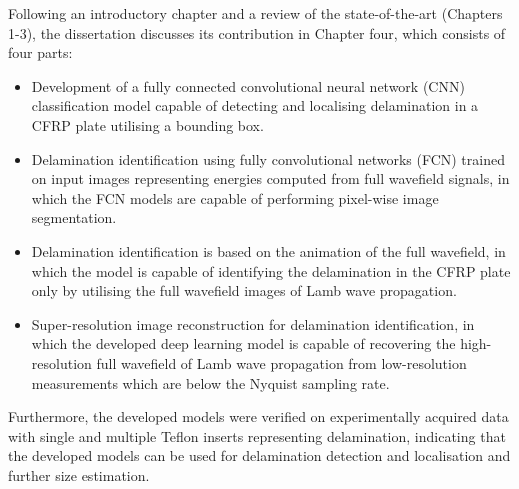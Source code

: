 \documentclass{article}
\begin{document}
	Following an introductory chapter and a review of the state-of-the-art (Chapters 1-3), the dissertation discusses its contribution in Chapter four, which consists of four parts:
	\begin{itemize}
		\item Development of a fully connected convolutional neural network (CNN) classification model capable of detecting and localising delamination in a CFRP plate utilising a bounding box.
		\item Delamination identification using fully convolutional networks (FCN) trained on input images representing energies computed from full wavefield signals, in which the FCN models are capable of performing pixel-wise image segmentation.
		\item Delamination identification is based on the animation of the full wavefield, in which the model is capable of identifying the delamination in the CFRP plate only by utilising the full wavefield images of Lamb wave propagation.
		\item Super-resolution image reconstruction for delamination identification, in which the developed deep learning model is capable of recovering the high-resolution full wavefield of Lamb wave propagation from low-resolution measurements which are below the Nyquist sampling rate.
	\end{itemize}
	Furthermore, the developed models were verified on experimentally acquired data with single and multiple Teflon inserts representing delamination, indicating that the developed models can be used for
	delamination detection and localisation and further size estimation.
\end{document}
